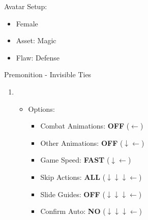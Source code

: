Avatar Setup:
\begin{itemize}
	\item Female
	\item Asset: Magic
	\item Flaw: Defense
\end{itemize}
\begin{battlespecial}{Premonition - Invisible Ties}
\begin{enumerate}
\item \ 
\begin{itemize}
\item Options:
\begin{itemize}
\item Combat Animations: \textbf{OFF} ($\leftarrow$)
\item Other Animations: \textbf{OFF} ($\downarrow\leftarrow$)
\item Game Speed: \textbf{FAST} ($\downarrow\leftarrow$)
\item Skip Actions: \textbf{ALL} ($\downarrow\downarrow\downarrow\leftarrow$)
\item Slide Guides: \textbf{OFF} ($\downarrow\downarrow\downarrow\leftarrow$)
\item Confirm Auto: \textbf{NO} ($\downarrow\downarrow\downarrow\leftarrow$)
\end{itemize}
\autoblitz
\auto
\end{itemize}
\autoturn
\end{enumerate}
\end{battlespecial}